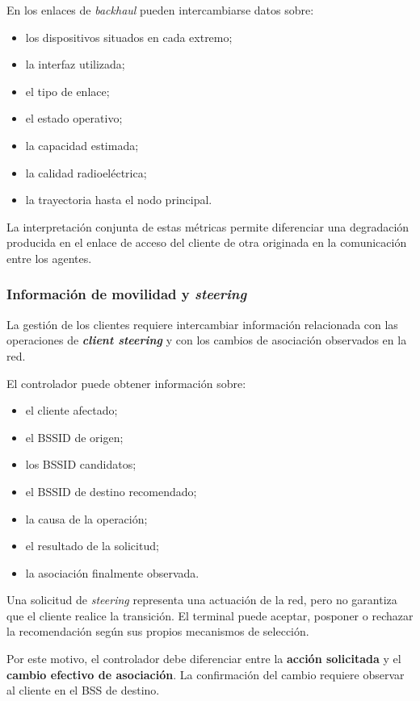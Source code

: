 En los enlaces de \textit{backhaul} pueden intercambiarse datos sobre:

\begin{itemize}
    \item los dispositivos situados en cada extremo;
    \item la interfaz utilizada;
    \item el tipo de enlace;
    \item el estado operativo;
    \item la capacidad estimada;
    \item la calidad radioeléctrica;
    \item la trayectoria hasta el nodo principal.
\end{itemize}

La interpretación conjunta de estas métricas permite diferenciar una
degradación producida en el enlace de acceso del cliente de otra
originada en la comunicación entre los agentes.


\subsubsection*{Información de movilidad y \textit{steering}}

La gestión de los clientes requiere intercambiar información relacionada
con las operaciones de \textbf{\textit{client steering}} y con los
cambios de asociación observados en la red.

El controlador puede obtener información sobre:

\begin{itemize}
    \item el cliente afectado;
    \item el BSSID de origen;
    \item los BSSID candidatos;
    \item el BSSID de destino recomendado;
    \item la causa de la operación;
    \item el resultado de la solicitud;
    \item la asociación finalmente observada.
\end{itemize}

Una solicitud de \textit{steering} representa una actuación de la red,
pero no garantiza que el cliente realice la transición. El terminal puede
aceptar, posponer o rechazar la recomendación según sus propios
mecanismos de selección.

Por este motivo, el controlador debe diferenciar entre la
\textbf{acción solicitada} y el
\textbf{cambio efectivo de asociación}. La confirmación del cambio
requiere observar al cliente en el BSS de destino.



